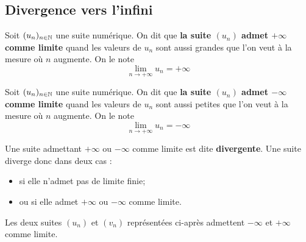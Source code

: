 \documentclass{poly}
\begin{document}
\subsection{Divergence vers l'infini}
\begin{definition}
Soit $(u_n)_{n \in \mathbb{N}}$ une suite numérique. On dit que \textbf{la suite $(u_n)$ admet $+\infty$ comme limite} quand les valeurs de $u_n$ sont aussi grandes que l'on veut à la mesure où $n$ augmente. On le note
\begin{equation*}
\lim_{n \to +\infty} u_n = +\infty 
\end{equation*}
\end{definition}    
\begin{definition}
Soit $(u_n)_{n \in \mathbb{N}}$ une suite numérique. On dit que \textbf{la suite $(u_n)$ admet $-\infty$ comme limite} quand les valeurs de $u_n$ sont aussi petites que l'on veut à la mesure où $n$ augmente. On le note
\begin{equation*}
\lim_{n \to +\infty} u_n = -\infty 
\end{equation*}
\end{definition}    
\begin{remark}
Une suite admettant $+\infty$ ou $-\infty$ comme limite est dite \textbf{divergente}. Une suite diverge donc dans deux cas :
\begin{itemize}
\item si elle n'admet pas de limite finie;
\item ou si elle admet $+\infty$ ou $-\infty$ comme limite.
\end{itemize}
\end{remark}
\begin{example}
Les deux suites $(u_n)$ et $(v_n)$ représentées ci-après admettent $-\infty$ et $+\infty$ comme limite.
\begin{minipage}{0.45\textwidth}
\begin{center}
\end{center}
\end{minipage}
\hfill
\begin{minipage}{0.45\textwidth}
\begin{center}
\end{center}
\end{minipage}
\end{example}
\newpage
\end{document}
